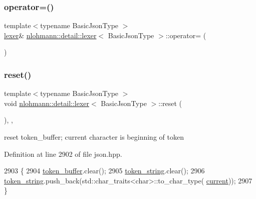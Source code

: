 \subsubsection{\texorpdfstring{operator=()}{operator=()}}
{\footnotesize\ttfamily template$<$typename Basic\+Json\+Type $>$ \\
\hyperlink{classnlohmann_1_1detail_1_1lexer}{lexer}\& \hyperlink{classnlohmann_1_1detail_1_1lexer}{nlohmann\+::detail\+::lexer}$<$ Basic\+Json\+Type $>$\+::operator= (\begin{DoxyParamCaption}\item[{\hyperlink{classnlohmann_1_1detail_1_1lexer}{lexer}$<$ Basic\+Json\+Type $>$ \&}]{ }\end{DoxyParamCaption})\hspace{0.3cm}{\ttfamily [delete]}}

\mbox{\label{classnlohmann_1_1detail_1_1lexer_acba34bc18af19f93186e682d02c3942d}} 
\subsubsection{\texorpdfstring{reset()}{reset()}}
{\footnotesize\ttfamily template$<$typename Basic\+Json\+Type $>$ \\
void \hyperlink{classnlohmann_1_1detail_1_1lexer}{nlohmann\+::detail\+::lexer}$<$ Basic\+Json\+Type $>$\+::reset (\begin{DoxyParamCaption}{ }\end{DoxyParamCaption})\hspace{0.3cm}{\ttfamily [inline]}, {\ttfamily [private]}, {\ttfamily [noexcept]}}



reset token\+\_\+buffer; current character is beginning of token 



Definition at line 2902 of file json.\+hpp.


\begin{DoxyCode}
2903     \{
2904         \hyperlink{classnlohmann_1_1detail_1_1lexer_aaa7a7bba826023ee34e9c99d51d55468}{token\_buffer}.clear();
2905         \hyperlink{classnlohmann_1_1detail_1_1lexer_ad2960e3d54af8fb8d572a8f6f7731d62}{token\_string}.clear();
2906         \hyperlink{classnlohmann_1_1detail_1_1lexer_ad2960e3d54af8fb8d572a8f6f7731d62}{token\_string}.push\_back(std::char\_traits<char>::to\_char\_type(
      \hyperlink{classnlohmann_1_1detail_1_1lexer_a47169f9aaf0da4c9885e61d3109859aa}{current}));
2907     \}
\end{DoxyCode}
\mbox{\label{classnlohmann_1_1detail_1_1lexer_aac3041cd2b9291e64fee38db422863c9}} 
